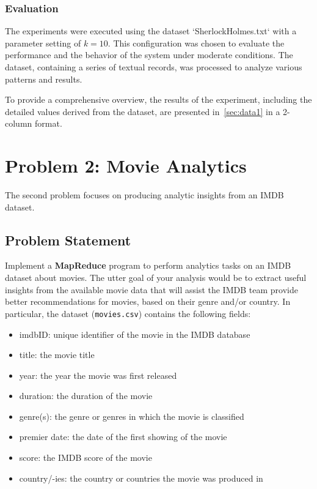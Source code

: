 \documentclass[acmlarge]{acmart}
\begin{document}
\subsubsection{Evaluation}
The experiments were executed using the dataset `SherlockHolmes.txt` with a parameter setting of \( k = 10 \).
This configuration was chosen to evaluate the performance and the behavior of the system under moderate conditions.
The dataset, containing a series of textual records, was processed to analyze various patterns and results.

To provide a comprehensive overview, the results of the experiment, including the detailed values derived from the
dataset, are presented in~\autoref{sec:data1} in a 2-column format.


\section{Problem 2: Movie Analytics}
\label{sec:problem2}
The second problem focuses on producing analytic insights from an IMDB dataset.


\subsection{Problem Statement}
Implement a \textbf{MapReduce} program to perform analytics tasks on an IMDB dataset about movies. The utter goal of your analysis would be to extract useful insights from the available movie data that will assist the IMDB team provide better recommendations for movies, based on their genre and/or country. In particular, the dataset (\texttt{movies.csv}) contains the following fields:
\begin{itemize}
  \item imdbID: unique identifier of the movie in the IMDB database
  \item title: the movie title
  \item year: the year the movie was first released
  \item duration: the duration of the movie
  \item genre(s): the genre or genres in which the movie is classified
  \item premier date: the date of the first showing of the movie
  \item score: the IMDB score of the movie
  \item country/-ies: the country or countries the movie was produced in
\end{itemize}
\end{document}
